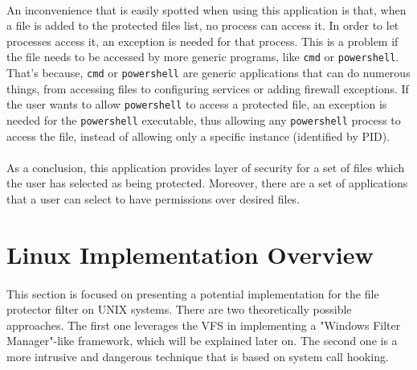 	\paragraph{}
	An inconvenience that is easily spotted when using this application is that, when a file is added to the protected files list, no process can access it. In order to let processes access it, an exception is needed for that process. This is a problem if the file needs to be accessed by more generic programs, like \texttt{cmd} or \texttt{powershell}. That's because, \texttt{cmd} or \texttt{powershell} are generic applications that can do numerous things, from accessing files to configuring services or adding firewall exceptions. If the user wants to allow \texttt{powershell} to access a protected file, an exception is needed for the \texttt{powershell} executable, thus allowing any \texttt{powershell} process to access the file, instead of allowing only a specific instance (identified by PID).
	
	
	\paragraph{}
	As a conclusion, this application provides layer of security for a set of files which the user has selected as being protected. Moreover, there are a set of applications that a user can select to have permissions over desired files.
	
	\newpage
	\section{Linux Implementation Overview}
	\paragraph{}
	This section is focused on presenting a potential implementation for the file protector filter on UNIX systems. There are two theoretically possible approaches. The first one leverages the VFS in implementing a "Windows Filter Manager"-like framework, which will be explained later on. The second one is a more intrusive and dangerous technique that is based on system call hooking. 
	
